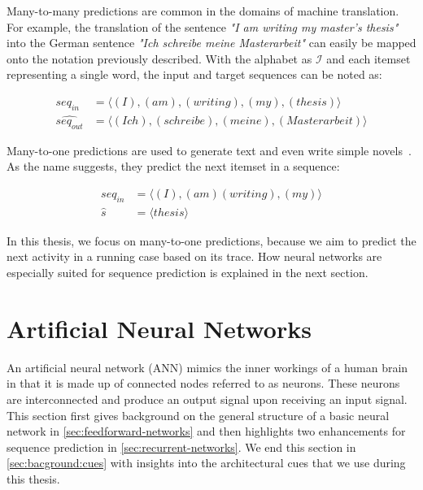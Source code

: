 Many-to-many predictions are common in the domains of machine translation. For example, the translation of the sentence \textit{"I am writing my master's thesis"} into the German sentence \textit{"Ich schreibe meine Masterarbeit"} can easily be mapped onto the notation previously described. With the alphabet as $\mathscr{I}$ and each itemset representing a single word, the input and target sequences can be noted as:

\begin{equation*}
\begin{split}
           seq_{in} &= \langle(I),(am),(writing),(my),(thesis)\rangle\\
\widehat{seq_{out}} &= \langle(Ich),(schreibe),(meine),(Masterarbeit)\rangle
\end{split}
\end{equation*}

Many-to-one predictions are used to generate text and even write simple novels~\cite{web:text-generation-machinelearningmastery, web:text-generation-freecodecamp}. As the name suggests, they predict the next itemset in a sequence:

\begin{equation*}
\begin{split}
seq_{in}  &= \langle(I),(am) (writing),(my)\rangle\\
\hat{s} &= \langle thesis\rangle
\end{split}
\end{equation*}

In this thesis, we focus on many-to-one predictions, because we aim to predict the next activity in a running case based on its trace. How neural networks are especially suited for sequence prediction is explained in the next section.

\section{Artificial Neural Networks}\label{sec:artificial-neural-networks}
An artificial neural network (ANN) mimics the inner workings of a human brain in that it is made up of connected nodes referred to as neurons. These neurons are interconnected and produce an output signal upon receiving an input signal. This section first gives background on the general structure of a basic neural network in \autoref{sec:feedforward-networks} and then highlights two enhancements for sequence prediction in \autoref{sec:recurrent-networks}.
We end this section in \autoref{sec:bacground:cues} with insights into the architectural cues that we use during this thesis.

